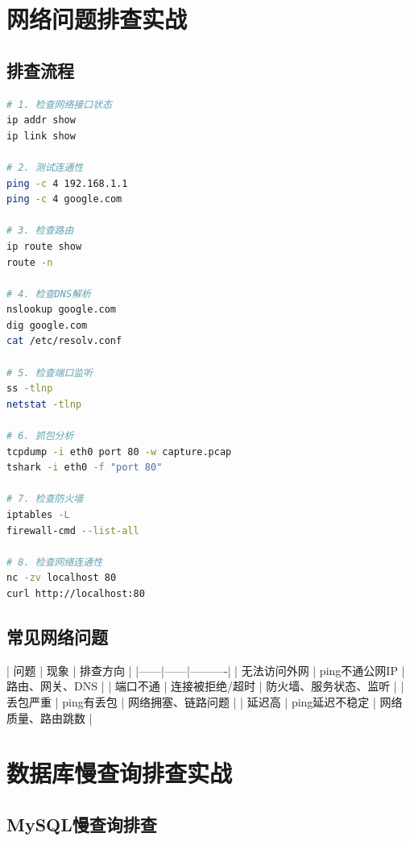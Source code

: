 \documentclass[12pt,UTF8]{ctexbook}
\begin{document}
\section{网络问题排查实战}
\label{sec:network-troubleshoot}

\subsection*{排查流程}

\begin{lstlisting}[language=bash]
# 1. 检查网络接口状态
ip addr show
ip link show

# 2. 测试连通性
ping -c 4 192.168.1.1
ping -c 4 google.com

# 3. 检查路由
ip route show
route -n

# 4. 检查DNS解析
nslookup google.com
dig google.com
cat /etc/resolv.conf

# 5. 检查端口监听
ss -tlnp
netstat -tlnp

# 6. 抓包分析
tcpdump -i eth0 port 80 -w capture.pcap
tshark -i eth0 -f "port 80"

# 7. 检查防火墙
iptables -L
firewall-cmd --list-all

# 8. 检查网络连通性
nc -zv localhost 80
curl http://localhost:80
\end{lstlisting}

\subsection*{常见网络问题}

| 问题 | 现象 | 排查方向 |
|------|------|----------|
| 无法访问外网 | ping不通公网IP | 路由、网关、DNS |
| 端口不通 | 连接被拒绝/超时 | 防火墙、服务状态、监听 |
| 丢包严重 | ping有丢包 | 网络拥塞、链路问题 |
| 延迟高 | ping延迟不稳定 | 网络质量、路由跳数 |

\section{数据库慢查询排查实战}
\label{sec:db-slow-query}

\subsection*{MySQL慢查询排查}
\end{document}
